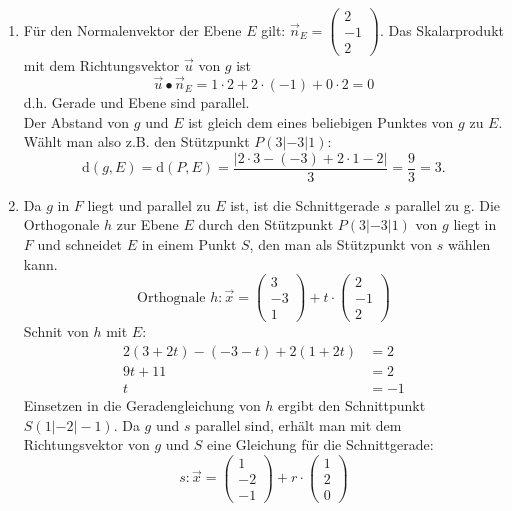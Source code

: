 \begin{lsg}{}
\begin{enumerate}
  \item Für den Normalenvektor der Ebene $E$ gilt: $\vec n_E=\left(\begin{array}{c} 2\\ -1\\ 2\end{array}\right)$. Das Skalarprodukt mit dem Richtungsvektor $\vec u$ von $g$ ist
  \begin{equation*}
    \vec u\bullet\vec n_E = 1\cdot 2 + 2\cdot(-1) + 0\cdot 2 = 0
  \end{equation*}
  d.h. Gerade und Ebene sind parallel.
  \\Der Abstand von $g$ und $E$ ist gleich dem eines beliebigen Punktes von $g$ zu $E$. Wählt man also z.B. den Stützpunkt $P(3|-3|1)$:
  \begin{equation*}
    \mathrm d(g,E)=\mathrm d(P,E)=\frac{|2\cdot3-(-3)+2\cdot1-2|}{3}=\frac{9}{3} = 3.
  \end{equation*}
  \item Da $g$ in $F$ liegt und parallel zu $E$ ist, ist die Schnittgerade $s$ parallel zu g.
  Die Orthogonale $h$ zur Ebene $E$ durch den Stützpunkt $P(3|-3|1)$ von $g$ liegt in $F$ und schneidet $E$ in einem Punkt $S$, den man als Stützpunkt von $s$ wählen kann.
  \begin{equation*}
    \text{Orthognale } h:\vec x = \left(\begin{array}{c}3\\-3\\1\end{array}\right)+t\cdot\left(\begin{array}{c}2\\-1\\2\end{array}\right)
  \end{equation*}
  Schnit von $h$ mit $E$:
  \begin{align*}
    2(3+2t)-(-3-t)+2(1+2t)&=2\\
    9t+11&=2\\
    t&=-1
  \end{align*}
  Einsetzen in die Geradengleichung von $h$ ergibt den Schnittpunkt $S(1|-2|-1)$. Da $g$ und $s$ parallel sind, erhält man mit dem Richtungsvektor von $g$ und $S$ eine Gleichung für die Schnittgerade:
  \begin{equation*}
    s:\vec x=\left(\begin{array}{c}1\\-2\\-1\end{array}\right)+r\cdot\left(\begin{array}{c}1\\2\\0\end{array}\right)
  \end{equation*}
\end{enumerate}
\end{lsg}

